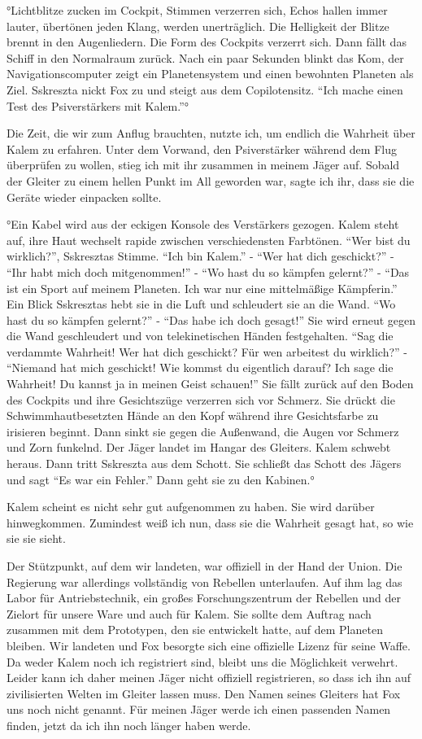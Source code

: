 \documentclass[11pt]{article}
\begin{document}
°Lichtblitze zucken im Cockpit, Stimmen verzerren sich, Echos hallen
immer lauter, übertönen jeden Klang, werden unerträglich. Die Helligkeit
der Blitze brennt in den Augenliedern. Die Form des Cockpits verzerrt
sich. Dann fällt das Schiff in den Normalraum zurück. Nach ein paar
Sekunden blinkt das Kom, der Navigationscomputer zeigt ein
Planetensystem und einen bewohnten Planeten als Ziel. Sskreszta nickt
Fox zu und steigt aus dem Copilotensitz. ``Ich mache einen Test des
Psiverstärkers mit Kalem.''°

Die Zeit, die wir zum Anflug brauchten, nutzte ich, um endlich die
Wahrheit über Kalem zu erfahren. Unter dem Vorwand, den Psiverstärker
während dem Flug überprüfen zu wollen, stieg ich mit ihr zusammen in
meinem Jäger auf. Sobald der Gleiter zu einem hellen Punkt im All
geworden war, sagte ich ihr, dass sie die Geräte wieder einpacken
sollte.

°Ein Kabel wird aus der eckigen Konsole des Verstärkers gezogen. Kalem
steht auf, ihre Haut wechselt rapide zwischen verschiedensten Farbtönen.
``Wer bist du wirklich?'', Sskresztas Stimme. ``Ich bin Kalem.'' - ``Wer
hat dich geschickt?'' - ``Ihr habt mich doch mitgenommen!'' - ``Wo hast
du so kämpfen gelernt?'' - ``Das ist ein Sport auf meinem Planeten. Ich
war nur eine mittelmäßige Kämpferin.'' Ein Blick Sskresztas hebt sie in
die Luft und schleudert sie an die Wand. ``Wo hast du so kämpfen
gelernt?'' - ``Das habe ich doch gesagt!'' Sie wird erneut gegen die
Wand geschleudert und von telekinetischen Händen festgehalten. ``Sag die
verdammte Wahrheit! Wer hat dich geschickt? Für wen arbeitest du
wirklich?'' - ``Niemand hat mich geschickt! Wie kommst du eigentlich
darauf? Ich sage die Wahrheit! Du kannst ja in meinen Geist schauen!''
Sie fällt zurück auf den Boden des Cockpits und ihre Gesichtszüge
verzerren sich vor Schmerz. Sie drückt die Schwimmhautbesetzten Hände an
den Kopf während ihre Gesichtsfarbe zu irisieren beginnt. Dann sinkt sie
gegen die Außenwand, die Augen vor Schmerz und Zorn funkelnd. Der Jäger
landet im Hangar des Gleiters. Kalem schwebt heraus. Dann tritt
Sskreszta aus dem Schott. Sie schließt das Schott des Jägers und sagt
``Es war ein Fehler.'' Dann geht sie zu den Kabinen.°

Kalem scheint es nicht sehr gut aufgenommen zu haben. Sie wird darüber
hinwegkommen. Zumindest weiß ich nun, dass sie die Wahrheit gesagt hat,
so wie sie sie sieht.

Der Stützpunkt, auf dem wir landeten, war offiziell in der Hand der
Union. Die Regierung war allerdings vollständig von Rebellen
unterlaufen. Auf ihm lag das Labor für Antriebstechnik, ein großes
Forschungszentrum der Rebellen und der Zielort für unsere Ware und auch
für Kalem. Sie sollte dem Auftrag nach zusammen mit dem Prototypen, den
sie entwickelt hatte, auf dem Planeten bleiben. Wir landeten und Fox
besorgte sich eine offizielle Lizenz für seine Waffe. Da weder Kalem
noch ich registriert sind, bleibt uns die Möglichkeit verwehrt. Leider
kann ich daher meinen Jäger nicht offiziell registrieren, so dass ich
ihn auf zivilisierten Welten im Gleiter lassen muss. Den Namen seines
Gleiters hat Fox uns noch nicht genannt. Für meinen Jäger werde ich
einen passenden Namen finden, jetzt da ich ihn noch länger haben werde.
\end{document}
